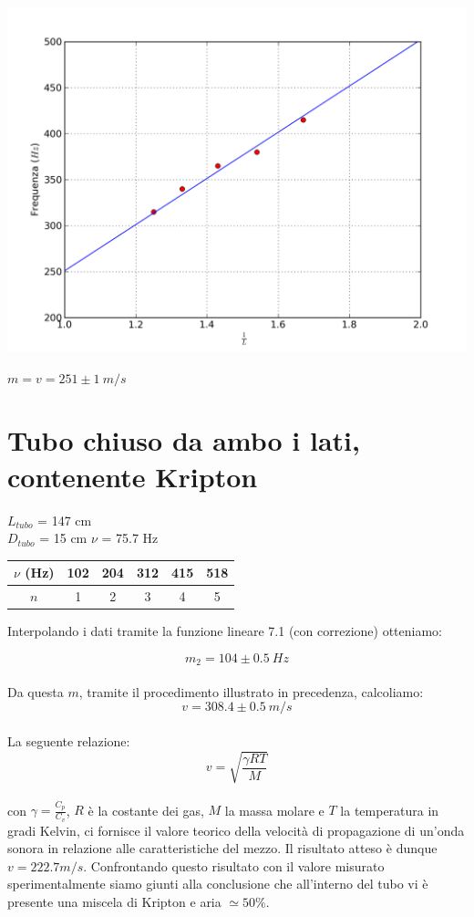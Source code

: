 \begin{center}
\includegraphics[scale=0.5]{../grafici/tubo/tubo3.png}

$m = v = 251\pm 1\ m/s$
\end{center}

\section{Tubo chiuso da ambo i lati, contenente Kripton}

$L_{tubo}$ = 147 cm\\
$D_{tubo}$ = 15 cm
$\nu$ = 75.7 Hz
 
\begin{center}
\begin{tabular}{c|c|c|c|c|c}
$\nu$ (Hz) & 102 & 204 & 312 & 415 & 518 \\
\midrule
$n$ & 1 & 2 & 3 & 4 & 5\\
\end{tabular}
\end{center}
Interpolando i dati tramite la funzione lineare 7.1 (con correzione) otteniamo:

$$ m_2 = 104 \pm 0.5 \ Hz  $$ 
\\
Da questa $m$, tramite il procedimento illustrato in precedenza, calcoliamo: 
$$v = 308.4\pm0.5\ m/s $$
\\
La seguente relazione:
$$v=\sqrt{\frac{\gamma RT}{M}}$$
\\
con $\gamma = \frac{C_p}{C_v}$, $R$ è la costante dei gas, $M$ la massa molare e $T$ la temperatura in gradi Kelvin, ci fornisce il valore teorico della velocità di propagazione di un'onda sonora in relazione alle caratteristiche del mezzo. 
Il risultato atteso è dunque $v=222.7 m/s$. Confrontando questo risultato con il valore misurato sperimentalmente siamo giunti alla conclusione che all'interno del tubo vi è presente una miscela di Kripton e aria $\simeq 50\%.$



